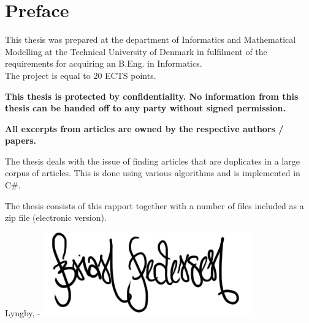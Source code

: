 \chapter{Preface}

This thesis was prepared at the department of Informatics and Mathematical Modelling at the Technical University of Denmark in fulfilment of the
requirements for acquiring an B.Eng. in Informatics. \\
The project is equal to 20 ECTS points.

\textbf{This thesis is protected by confidentiality. No information from this thesis can be handed off to any party without signed permission.}

\textbf{All excerpts from articles are owned by the respective authors / papers. }

The thesis deals with the issue of finding articles that are duplicates in a large corpus of articles. This is done using various algorithms and is implemented in C\#.

The thesis consists of this rapport together with a number of files included as a zip file (electronic version).
\vspace{20mm}
\begin{center}
    \hspace{20mm} Lyngby, \thesishandin-\thesisyear
    \vspace{5mm}
    \newline
    \includegraphics[scale=0.5]{figures/Signature}
\end{center}
\begin{flushright}
    \thesisauthor
\end{flushright}
